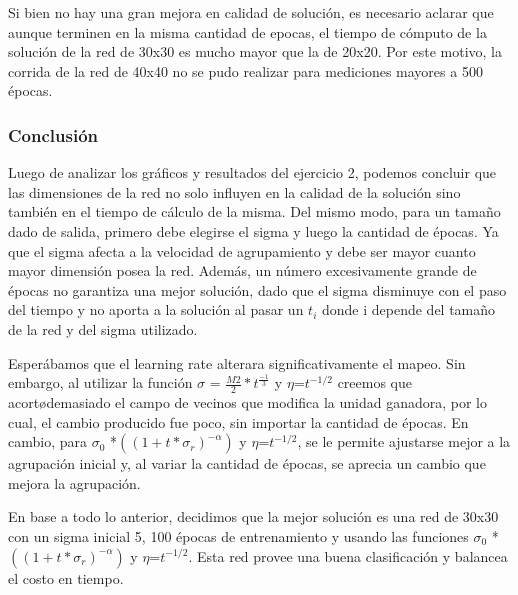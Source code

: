 Si bien no hay una gran mejora en calidad de soluci\'on, es necesario aclarar que aunque terminen en la misma cantidad de epocas, el tiempo de c\'omputo de la soluci\'on de la red de 30x30 es mucho mayor que la de 20x20. Por este motivo, la corrida de la red de 40x40 no se pudo realizar para mediciones mayores a 500 \'epocas.

\subsubsection{Conclusi\'on}

Luego de analizar los gr\'aficos y resultados del ejercicio 2, podemos concluir que las dimensiones de la red no solo influyen en la calidad de la soluci\'on sino tambi\'en en el tiempo de c\'alculo de la misma. Del mismo modo, para un tama\~no dado de salida, primero debe elegirse el sigma y luego la cantidad de \'epocas. Ya que el sigma afecta a la velocidad de agrupamiento y debe ser mayor cuanto mayor dimensi\'on posea la red. Adem\'as, un n\'umero excesivamente grande de \'epocas no garantiza una mejor soluci\'on, dado que el sigma disminuye con el paso del tiempo y no aporta a la soluci\'on al pasar un $t_i$ donde i depende del tama\~no de la red y del sigma utilizado.

Esper\'abamos que el learning rate alterara significativamente el mapeo. Sin embargo, al utilizar la funci\'on $\sigma$ = $\frac{M2}{2}*t^\frac{-1}{3}$ y $\eta$=$t^{-1/2}$  creemos que acort\o demasiado el campo de vecinos que modifica la unidad ganadora, por lo cual, el cambio producido fue poco, sin importar la cantidad de \'epocas.
En cambio, para $\sigma_0$ *$((1+t*\sigma_r)^{-\alpha})$ y $\eta$=$t^{-1/2}$, se le permite ajustarse mejor a la agrupaci\'on inicial y, al variar la cantidad de \'epocas, se aprecia un cambio que mejora la agrupaci\'on.

En base a todo lo anterior, decidimos que la mejor soluci\'on es una red de 30x30 con un sigma inicial 5, 100 \'epocas de entrenamiento y usando las funciones $\sigma_0$ *$((1+t*\sigma_r)^{-\alpha})$ 
y $\eta$=$t^{-1/2}$. Esta red provee una buena clasificaci\'on y balancea el costo en tiempo.

